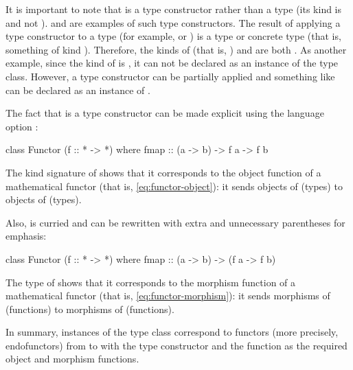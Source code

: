 It is important to note that  is a type constructor
rather than a type (its kind is \texthaskell{* -> *} and not
\texthaskell{*}). \texthaskell{[]} and  are
examples of such type constructors. The result of applying a type
constructor to a type (for example,  or
) is a type or concrete type (that is, something of
kind \texthaskell{*}). Therefore, the kinds of 
(that is, \texthaskell{[Int]}) and  are both
\texthaskell{*}. As another example, since the kind of
 is \texthaskell{* -> * -> *}, it can not be
declared as an instance of the  type class.
However, a type constructor can be partially applied and something
like  can be declared as an instance of
.

The fact that  is a type constructor can be made
explicit using the language option :
\begin{codehaskell}
class Functor (f :: * -> *) where
  fmap :: (a -> b) -> f a -> f b
\end{codehaskell}
The kind signature of  shows that it corresponds to the
object function of a mathematical functor (that is,
\eqref{eq:functor-object}): it sends objects of \hask (types) to
objects of \hask (types).

Also,  is curried and can be rewritten with extra
and unnecessary parentheses for emphasis:
\begin{codehaskell}
class Functor (f :: * -> *) where
  fmap :: (a -> b) -> (f a -> f b)
\end{codehaskell}
The type of  shows that it corresponds to the
morphism function of a mathematical functor (that is,
\eqref{eq:functor-morphism}): it sends morphisms of \hask (functions)
to morphisms of \hask (functions).

In summary, instances of the  type class
correspond to functors (more precisely, endofunctors) from \hask to
\hask with the type constructor and the  function as
the required object and morphism functions.

